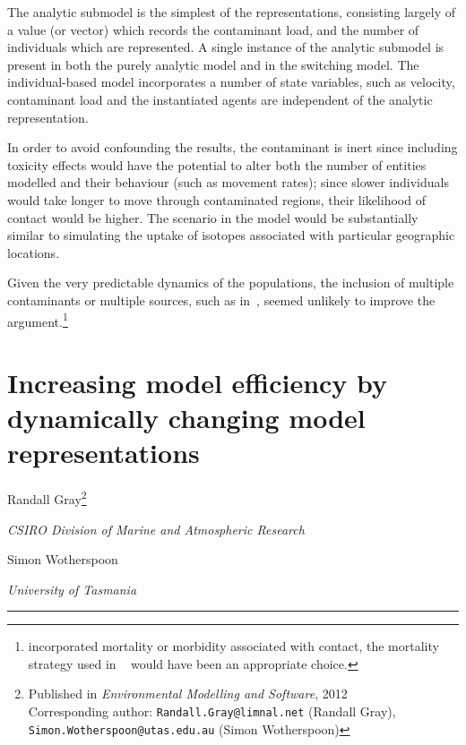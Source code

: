The analytic submodel is the simplest of the representations,
consisting largely of a value (or vector) which records the
contaminant load, and the number of individuals which are represented.
A single instance of the analytic submodel is present in both the 
purely analytic model and in the switching model.  The individual-based
model incorporates a number of state variables, such as velocity,
contaminant load and the instantiated agents are independent of the
analytic representation.

In order to avoid confounding the results, the contaminant is inert
since including toxicity effects would have the potential to alter
both the number of entities modelled and their behaviour (such as
movement rates); since slower individuals would take longer to move
through contaminated regions, their likelihood of contact would be
higher.  The scenario in the model would be substantially similar to
simulating the uptake of isotopes associated with particular geographic
locations.

Given the very predictable dynamics of the populations, the inclusion
of multiple contaminants or multiple sources, such as
in~\cite{gray2006nws, gray2014}, seemed unlikely to improve the
argument.\footnote{incorporated mortality or morbidity associated with
  contact, the mortality strategy used in ~\citet{grayningaloo} would
  have been an appropriate choice.}

\pagebreak

\section*{Increasing model efficiency by dynamically changing model representations}
\begin{center}
    Randall Gray\footnote{
     {Published in \emph{Environmental Modelling and Software\/}, 2012}\\
       Corresponding author:
      \texttt{Randall.Gray@limnal.net} (Randall Gray),\\
      \texttt{Simon.Wotherspoon@utas.edu.au} (Simon Wotherspoon)
    }

    \emph{CSIRO Division of Marine and Atmospheric Research\/}

    Simon Wotherspoon 

    \emph{University of Tasmania\/}
\end{center}

\rule{\textwidth}{2pt}

